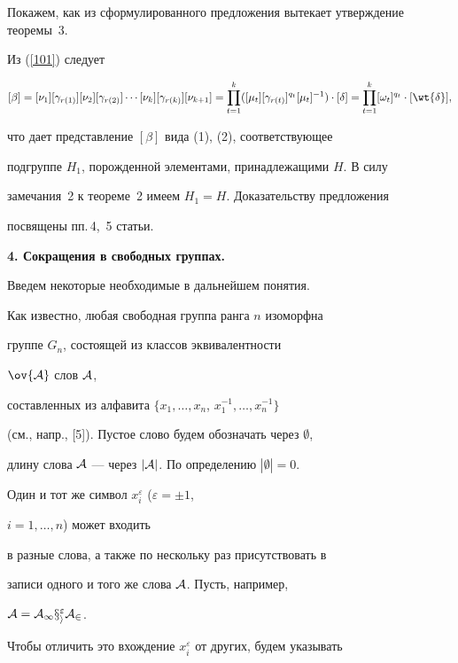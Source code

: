 Покажем, как из сформулированного предложения вытекает утверждение теоремы~3.


Из (\ref{101}) следует


$$


[\beta]=[\nu_1][\gamma_{r(1)}][\nu_2][\gamma_{r(2)}]\dotsb


[\nu_k][\gamma_{r(k)}][\nu_{k+1}]= 


\prod_{t=1}^k([\mu_t][\gamma_{r(t)}]^{q_t}[\mu_t]^{-1}


)\cdot[\delta]=\prod_{t=1}^k[\omega_t]^{q_t}\cdot[\wt{\delta}],


$$


что дает представление $[\beta]$ вида (1), (2), соответствующее


подгруппе $H_1$, порожденной элементами, принадлежащими $H$. В силу


замечания~2 к теореме~2 имеем $H_1=H$. Доказательству предложения


посвящены пп.\,4,~5 статьи.


\medskip





{\bf 4. Сокращения в свободных группах.}


Введем некоторые необходимые в дальнейшем понятия.


Как известно, любая свободная группа ранга $n$ изоморфна


группе $G_{{n}} $, состоящей из классов эквивалентности


$\ov{\cal A}$ слов $\cal A$,


составленных из алфавита $\{x_1,\dotsc,x_n$, $x^{-1}_1,\dotsc,x^{-1}_n\}$


(см., напр., [5]). Пустое слово будем обозначать через $\emptyset$,


длину слова $\cal A$ --- через $|\cal A|$. По определению $|\emptyset|=0$.





Один и тот же символ $x^{\varepsilon}_i$ ($\varepsilon=\pm1$,


$i=1,\dotsc,n$) может входить


в разные слова, а также по нескольку раз присутствовать в


записи одного и того же слова $\cal A$. Пусть, например,


$\cal A=\cal A_1 x^{\varepsilon}_i\cal A_2$.


Чтобы отличить это вхождение $x^{\varepsilon}_i$ от других, будем указывать


